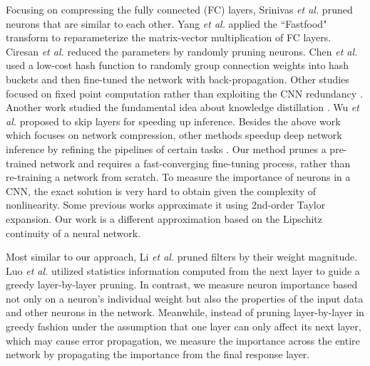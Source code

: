 \documentclass[10pt,twocolumn,letterpaper]{article}
\begin{document}
Focusing on compressing the fully connected (FC) layers, Srinivas \emph{et al.}\cite{Datafree} pruned neurons that are similar to each other.
Yang \emph{et al.}\cite{fry} applied the ``Fastfood" transform to reparameterize the matrix-vector multiplication of FC layers. 
Ciresan \emph{et al.}\cite{random} reduced the parameters by randomly pruning neurons.
Chen \emph{et al.}\cite{hash} used a low-cost hash function to randomly group connection weights into hash buckets and then fine-tuned the network with back-propagation.
Other studies focused on fixed point computation rather than exploiting the CNN redundancy \cite{precision,binary}. Another work studied the fundamental idea about knowledge distillation \cite{Distilling}. Wu \textit{et al.}\cite{Zuxuan} proposed to skip layers for speeding up inference. Besides the above work which focuses on network compression, other methods speedup deep network inference by refining the pipelines of certain tasks \cite{faster,yu1,yu3, ssd}.
Our method prunes a pre-trained network and requires a fast-converging fine-tuning process, rather than re-training a network from scratch.
To measure the importance of neurons in a CNN, the exact solution is very hard to obtain given the complexity of nonlinearity. Some previous works \cite{brain2,brain3,brain} approximate it using 2nd-order Taylor expansion. Our work is a different approximation based on the Lipschitz continuity of a neural network.

Most similar to our approach, Li \emph{et al.}\cite{pruneweigth} pruned filters by their weight magnitude. Luo \emph{et al.}\cite{thinet} utilized statistics information computed from the next layer to guide a greedy layer-by-layer pruning. In contrast, we measure neuron importance based not only on a neuron's individual weight but also the properties of the input data and other neurons in the network. Meanwhile, instead of pruning layer-by-layer in greedy fashion under the assumption that one layer can only affect its next layer, which may cause error propagation, we measure the importance across the entire network by propagating the importance from the final response layer.
\end{document}
